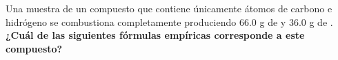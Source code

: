 Una muestra de un compuesto que contiene únicamente átomos de carbono e hidrógeno se combustiona completamente produciendo 66.0 g de  y 36.0 g de .
\textbf{¿Cuál de las siguientes fórmulas empíricas corresponde a este compuesto?}

\begin{choices}
    \choice  {}
    \choice  {}
    \choice  {}
    \choice  {}
\end{choices}